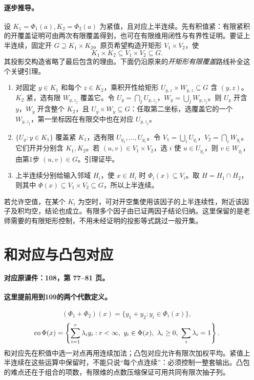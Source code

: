 \paragraph{逐步推导。}
设 $K_1=\Phi_1(a),K_2=\Phi_2(a)$ 为紧值，且对应上半连续。先有积值紧：有限紧积的开覆盖证明可由两次有限覆盖得到，也可在有限维用闭性与有界性证明。要证上半连续，固定开 $G\supseteq K_1\times K_2$。原页希望构造开矩形 $V_1\times V_2$，使
\[K_1\times K_2\subseteq V_1\times V_2\subseteq G.\]
其投影交构造省略了最后包含的理由。下面仍沿原来的\emph{开矩形有限覆盖}路线补全这个关键引理。
\begin{enumerate}
\item 对固定 $y\in K_1$ 和每个 $z\in K_2$，乘积开性给矩形 $U_{y,z}\times W_{y,z}\subseteq G$ 含 $(y,z)$。$K_2$ 紧，选有限 $W_{y,z_j}$ 覆盖它。令 $U_y=\bigcap_jU_{y,z_j}$，$W_y=\bigcup_jW_{y,z_j}$。则 $U_y$ 开含 $y$，$W_y$ 开含整个 $K_2$，且 $U_y\times W_y\subseteq G$：任取第二坐标，选覆盖它的一个 $W_{y,z_j}$，第一坐标因在有限交中也在对应 $U_{y,z_j}$。
\item $\{U_y:y\in K_1\}$ 覆盖紧 $K_1$，选有限 $U_{y_1},\ldots,U_{y_r}$。令 $V_1=\bigcup_iU_{y_i}$，$V_2=\bigcap_iW_{y_i}$。它们开并分别含 $K_1,K_2$。若 $(u,v)\in V_1\times V_2$，选 $i$ 使 $u\in U_{y_i}$，则 $v\in W_{y_i}$，由第1步 $(u,v)\in G$。引理证毕。
\item 上半连续分别给输入邻域 $H_i$，使 $x\in H_i$ 时 $\Phi_i(x)\subseteq V_i$。取 $H=H_1\cap H_2$，则其中 $\Phi(x)\subseteq V_1\times V_2\subseteq G$，所以上半连续。
\end{enumerate}
若允许空值，在某个 $K_i$ 为空时，可对开空集使用该因子的上半连续性，附近该因子及积均空，结论也成立。有限多个因子由已证两因子结论归纳。这里保留的是老师需要的有限矩形控制，不用未经证明的投影等式跳过一般开集。


\clearpage\section{和对应与凸包对应}\label{g:108:77}

\textbf{对应原课件：108，第 77--81 页。}


\paragraph{这里提前用到109的两个代数定义。}
\[(\Phi_1+\Phi_2)(x)=\{y_1+y_2:y_i\in\Phi_i(x)\},\]
\[\conv\Phi(x)=\left\{\sum_{i=1}^r\lambda_i y_i:
 r<\infty,\ y_i\in\Phi(x),\ \lambda_i\ge0,\ \sum_i\lambda_i=1\right\}.
\]
和对应先在积值中选一对点再用连续加法；凸包对应允许有限次加权平均。紧值上半连续在这些运算中保留时，不能只说“每个点连续”：必须控制一整套输出。凸包的难点还在于组合的项数，有限维的点数压缩保证可用共同有限次抽子列。


